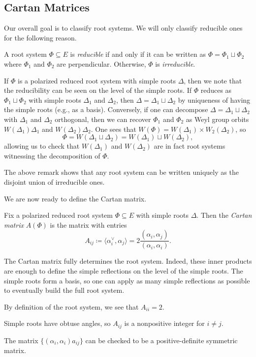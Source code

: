 \documentclass[../notes.tex]{subfiles}
\begin{document}
\subsection{Cartan Matrices}
Our overall goal is to classify root systems. We will only classify reducible ones for the following reason.
\begin{definition}[irreducible]
	A root system $\Phi\subseteq E$ is \textit{reducible} if and only if it can be written as $\Phi=\Phi_1\sqcup\Phi_2$ where $\Phi_1$ and $\Phi_2$ are perpendicular. Otherwise, $\Phi$ is \textit{irreducible}.
\end{definition}
\begin{remark}
	If $\Phi$ is a polarized reduced root system with simple roots $\Delta$, then we note that the reducibility can be seen on the level of the simple roots. If $\Phi$ reduces as $\Phi_1\sqcup\Phi_2$ with simple roots $\Delta_1$ and $\Delta_2$, then $\Delta=\Delta_1\sqcup\Delta_2$ by uniqueness of having the simple roots (e.g., as a basis). Conversely, if one can decompose $\Delta=\Delta_1\sqcup\Delta_2$ with $\Delta_1$ and $\Delta_2$ orthogonal, then we can recover $\Phi_1$ and $\Phi_2$ as Weyl group orbits $W(\Delta_1)\Delta_1$ and $W(\Delta_2)\Delta_2$. One sees that $W(\Phi)=W(\Delta_1)\times W_2(\Delta_2)$, so
	\[\Phi=W(\Delta_1\sqcup\Delta_2)=W(\Delta_1)\sqcup W(\Delta_2),\]
	allowing us to check that $W(\Delta_1)$ and $W(\Delta_2)$ are in fact root systems witnessing the decomposition of $\Phi$.
\end{remark}
\begin{remark}
	The above remark shows that any root system can be written uniquely as the disjoint union of irreducible ones.
\end{remark}
We are now ready to define the Cartan matrix.
\begin{definition}
	Fix a polarized reduced root system $\Phi\subseteq E$ with simple roots $\Delta$. Then the \textit{Cartan matrix} $A(\Phi)$ is the matrix with entries
	\[A_{ij}\coloneqq\langle\alpha_i^\lor,\alpha_j\rangle=2\frac{(\alpha_i,\alpha_j)}{(\alpha_i,\alpha_i)}.\]
\end{definition}
\begin{remark}
	The Cartan matrix fully determines the root system. Indeed, these inner products are enough to define the simple reflections on the level of the simple roots. The simple roots form a basis, so one can apply as many simple reflections as possible to eventually build the full root system.
\end{remark}
\begin{remark}
	By definition of the root system, we see that $A_{ii}=2$.
\end{remark}
\begin{remark}
	Simple roots have obtuse angles, so $A_{ij}$ is a nonpositive integer for $i\ne j$.
\end{remark}
\begin{remark}
	The matrix $\{(\alpha_i,\alpha_i)a_{ij}\}$ can be checked to be a positive-definite symmetric matrix.
\end{remark}
\end{document}
